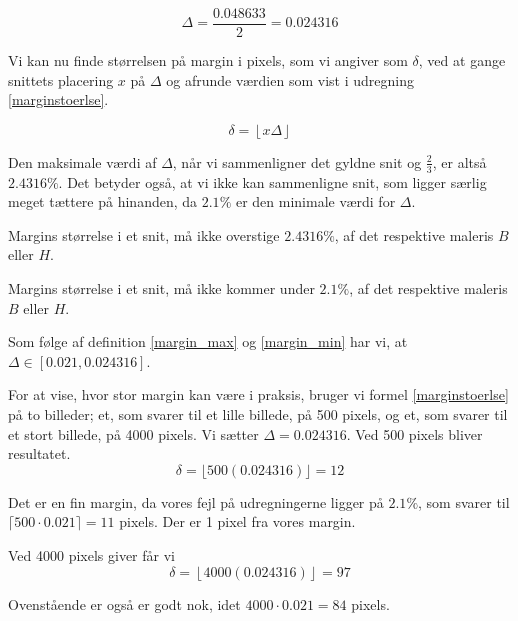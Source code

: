 {\begin{equation}
    \Delta = \frac{0.048633}{2} = 0.024316
    \label{find_Delta}
\end{equation}

Vi kan nu finde størrelsen på margin i pixels, som vi angiver som
$\delta$, ved at gange snittets placering $x$ på $\Delta$ og afrunde
værdien som vist i udregning \ref{marginstoerlse}.

\begin{equation}
	\delta = \left\lfloor x\Delta \right\rfloor
    \label{marginstoerlse}
\end{equation}

Den maksimale værdi af $\Delta$, når vi sammenligner det gyldne snit og
$\frac{2}{3}$, er altså $2.4316\%$. Det betyder også, at vi ikke kan
sammenligne snit, som ligger særlig meget tættere på hinanden, da
$2.1\%$ er den minimale værdi for $\Delta$.

\begin{definition}
    Margins størrelse i et snit, må ikke overstige $2.4316 \%$, af det
    respektive maleris $B$ eller $H$.
	\label{margin_max}
\end{definition}

\begin{definition}
	Margins størrelse i et snit, må ikke kommer under $2.1 \%$, af det
    respektive maleris $B$ eller $H$.
	\label{margin_min}
\end{definition}

Som følge af definition \ref{margin_max} og \ref{margin_min} har vi, at
$\Delta \in [0.021, 0.024316]$.

For at vise, hvor stor margin kan være i praksis, bruger vi formel
\ref{marginstoerlse} på to billeder; et, som svarer til et lille
billede, på 500 pixels, og et, som svarer til et stort billede, på 4000
pixels.  Vi sætter $\Delta = 0.024316$.  Ved 500 pixels bliver
resultatet.
\begin{equation}
	 \delta = \lfloor 500(0.024316)\rfloor = 12
\end{equation}

Det er en fin margin, da vores fejl på udregningerne ligger på $2.1\%$,
som svarer til $\lceil 500 \cdot 0.021 \rceil = 11$ pixels. Der er 1 pixel fra
vores margin.

Ved 4000 pixels giver får vi
\begin{equation}
	 \delta = \left\lfloor 4000(0.024316)\right\rfloor = 97
\end{equation}

Ovenstående er også er godt nok, idet $4000 \cdot 0.021 = 84$ pixels.

\clearpage
}
